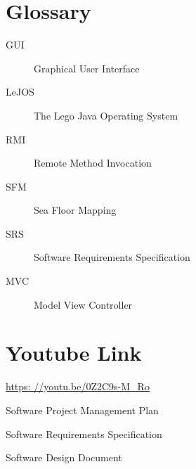 \documentclass[12pt]{article}
\begin{document}
\section{Glossary}

\begin{description}
\item [{GUI}] Graphical User Interface 
\item [{LeJOS}] The Lego Java Operating System 
\item [{RMI}] Remote Method Invocation 
\item [{SFM}] Sea Floor Mapping 
\item [{SRS}] Software Requirements Specification 
\item[{MVC}] Model View Controller

\end{description}


\section{Youtube Link}

\begin{description}

\item \url {https: //youtu.be/0Z2C9s-M_Ro} 

\end{description}


\begin{thebibliography}{1}

\bibitem{} Software Project Management Plan

\bibitem {}Software Requirements Specification

\bibitem {}Software Design Document
      
  \end{thebibliography}
\end{document}
